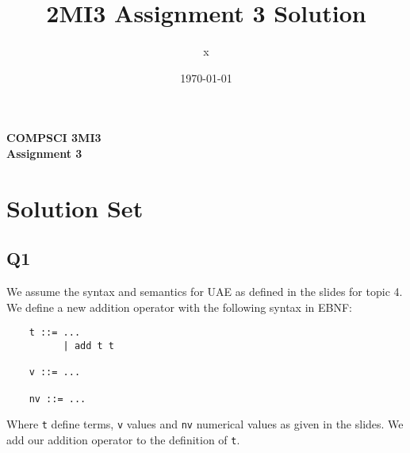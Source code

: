 \documentclass[12pt, fleqn]{article}
\title{2MI3 Assignment 3 Solution}
\author{x}
\date{\today}
\begin{document}
\begin{center}

    {\large \textbf{COMPSCI 3MI3}}\\[8mm]
    {\huge \textbf{Assignment 3}}\\[6mm]

\end{center}

\medskip

\section{Solution Set}

\subsection{Q1}

We assume the syntax and semantics for UAE as defined in the slides for topic 4.
We define a new addition operator with the following syntax in EBNF:
\begin{verbatim}
    t ::= ...
          | add t t
    
    v ::= ...
    
    nv ::= ...
\end{verbatim}
Where \verb|t| define terms, \verb|v| values and \verb|nv| numerical values as given in the slides. We add our addition operator to
the definition of \verb|t|.
\end{document}
